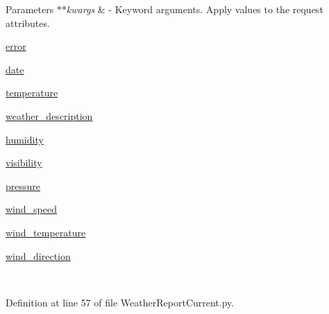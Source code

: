 \begin{DoxyParams}{Parameters}
{\em $\ast$$\ast$kwargs} & -\/ Keyword arguments. Apply values to the request attributes.
\begin{DoxyItemize}
\item \hyperlink{classRappCloud_1_1CloudMsgs_1_1WeatherReportCurrent_1_1WeatherReportCurrent_1_1Response_a8d3179a2b4db5abccfeab7492e1cfa42}{error}
\item \hyperlink{classRappCloud_1_1CloudMsgs_1_1WeatherReportCurrent_1_1WeatherReportCurrent_1_1Response_a7978fc9a561a264ee359a6d9a2b6646d}{date}
\item \hyperlink{classRappCloud_1_1CloudMsgs_1_1WeatherReportCurrent_1_1WeatherReportCurrent_1_1Response_aa4b017ec67179aa406ead6441237a229}{temperature}
\item \hyperlink{classRappCloud_1_1CloudMsgs_1_1WeatherReportCurrent_1_1WeatherReportCurrent_1_1Response_aace5374d6050b29773fc8d8107056478}{weather\-\_\-description}
\item \hyperlink{classRappCloud_1_1CloudMsgs_1_1WeatherReportCurrent_1_1WeatherReportCurrent_1_1Response_aec8bf35b5719955810af5f60937fbc33}{humidity}
\item \hyperlink{classRappCloud_1_1CloudMsgs_1_1WeatherReportCurrent_1_1WeatherReportCurrent_1_1Response_a14437cad48eb56b02ce5ef9a96a8cad6}{visibility}
\item \hyperlink{classRappCloud_1_1CloudMsgs_1_1WeatherReportCurrent_1_1WeatherReportCurrent_1_1Response_a7fc449dcfc75adac06186b75e1fb3aec}{pressure}
\item \hyperlink{classRappCloud_1_1CloudMsgs_1_1WeatherReportCurrent_1_1WeatherReportCurrent_1_1Response_a1d01988ef1a2203a5e11611ea384af8c}{wind\-\_\-speed}
\item \hyperlink{classRappCloud_1_1CloudMsgs_1_1WeatherReportCurrent_1_1WeatherReportCurrent_1_1Response_a3d3756623086d21e4c638cbcc9a18c63}{wind\-\_\-temperature}
\item \hyperlink{classRappCloud_1_1CloudMsgs_1_1WeatherReportCurrent_1_1WeatherReportCurrent_1_1Response_aa904e9f235ca25399e954292ba897e97}{wind\-\_\-direction} 
\end{DoxyItemize}\\
\hline
\end{DoxyParams}


Definition at line 57 of file Weather\-Report\-Current.\-py.



